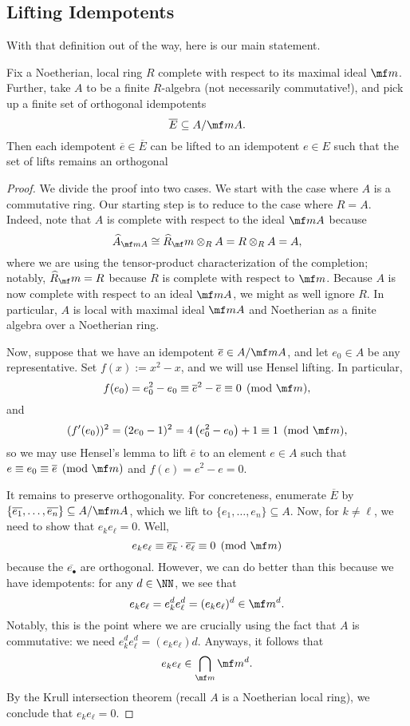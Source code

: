 \documentclass[../notes.tex]{subfiles}
\begin{document}
\subsection{Lifting Idempotents}
With that definition out of the way, here is our main statement.
\begin{proposition} \label{prop:liftidemp}
	Fix a Noetherian, local ring $R$ complete with respect to its maximal ideal $\mf m$. Further, take $A$ to be a finite $R$-algebra (not necessarily commutative!), and pick up a finite set of orthogonal idempotents
	\[\overline E\subseteq A/\mf mA.\]
	Then each idempotent $\overline e\in\overline E$ can be lifted to an idempotent $e\in E$ such that the set of lifts remains an orthogonal 
\end{proposition}
\begin{proof}
	We divide the proof into two cases. We start with the case where $A$ is a commutative ring. Our starting step is to reduce to the case where $R=A$. Indeed, note that $A$ is complete with respect to the ideal $\mf mA$ because
	\[\widehat A_{\mf mA}\cong\widehat R_\mf m\otimes_RA=R\otimes_RA=A,\]
	where we are using the tensor-product characterization of the completion; notably, $\widehat R_\mf m=R$ because $R$ is complete with respect to $\mf m$. Because $A$ is now complete with respect to an ideal $\mf mA$, we might as well ignore $R$. In particular, $A$ is local with maximal ideal $\mf mA$ and Noetherian as a finite algebra over a Noetherian ring.

	Now, suppose that we have an idempotent $\overline e\in A/\mf mA$, and let $e_0\in A$ be any representative. Set $f(x):=x^2-x$, and we will use Hensel lifting. In particular,
	\[f(e_0)=e_0^2-e_0\equiv\overline e^2-\overline e\equiv0\pmod{\mf m},\]
	and
	\[(f'(e_0))^2=(2e_0-1)^2=4\left(e_0^2-e_0\right)+1\equiv1\pmod{\mf m},\]
	so we may use Hensel's lemma to lift $\overline e$ to an element $e\in A$ such that $e\equiv e_0\equiv\overline e\pmod{\mf m}$ and $f(e)=e^2-e=0$.

	It remains to preserve orthogonality. For concreteness, enumerate $\overline E$ by $\{\overline{e_1},\ldots,\overline{e_n}\}\subseteq A/\mf mA$, which we lift to $\{e_1,\ldots,e_n\}\subseteq A$. Now, for $k\ne\ell$, we need to show that $e_ke_\ell=0$. Well,
	\[e_ke_\ell\equiv\overline{e_k}\cdot\overline{e_\ell}\equiv0\pmod{\mf m}\]
	because the $\overline{e_\bullet}$ are orthogonal. However, we can do better than this because we have idempotents: for any $d\in\NN$, we see that
	\[e_ke_\ell=e_k^de_\ell^d=(e_ke_\ell)^d\in\mf m^d.\]
	Notably, this is the point where we are crucially using the fact that $A$ is commutative: we need $e_k^de_\ell^d=(e_ke_\ell)d$. Anyways, it follows that
	\[e_ke_\ell\in\bigcap_{\mf m}\mf m^d.\]
	By the Krull intersection theorem (recall $A$ is a Noetherian local ring), we conclude that $e_ke_\ell=0$.


\end{proof}
\end{document}
